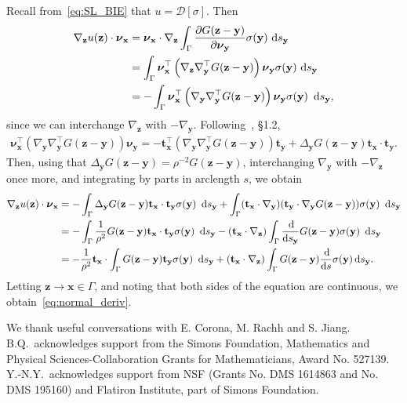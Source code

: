 \documentclass[prb,preprint,showpacs,preprintnumbers,amsmath,amssymb,longbibliography]{revtex4-1}
\newcommand{\nnu}{\boldsymbol{\nu}}
\newcommand{\xx}{\mathbf{x}}
\newcommand{\zz}{\mathbf{z}}
\newcommand{\yy}{\mathbf{y}}
\renewcommand{\tt}{\mathbf{t}}
\begin{document}
Recall from~\eqref{eq:SL_BIE} that $u = \mathcal{D}[\sigma]$.
Then  
\begin{align*}
\nabla_{\zz} u(\zz) \cdot \nnu_{\xx}
&=\nnu_\xx \cdot \nabla_\zz \int_\Gamma \frac{\partial G(\zz-\yy)}{\partial \nnu_\yy}\sigma(\yy) \,\dif s_\yy\\
&=\int_\Gamma \nnu_\xx^\top \left(\nabla_\zz\nabla_\yy^\top  G(\zz-\yy)\right) \nnu_\yy\sigma(\yy)  \,\dif s_\yy\\
  &=-\int_\Gamma \nnu_\xx^\top \left(\nabla_\yy\nabla_\yy^\top G(\zz-\yy)\right)\nnu_\yy\sigma(\yy)\ \dif s_\yy,
\end{align*}
since we can interchange $\nabla_\zz$ with $-\nabla_\yy$.
Following~\citet{Hsiao2008}, \S 1.2,
\begin{align}
\nnu_\xx^\top \left(\nabla_\yy\nabla_\yy^\top G(\zz-\yy)\right)\nnu_\yy
=
-\tt_{\xx}^\top \left(\nabla_\yy\nabla_\yy^\top G(\zz-\yy)\right)\tt_{\yy}
+ \Delta_{\yy}G(\zz-\yy) \tt_{\xx}\cdot \tt_{\yy}.
\end{align}
Then, using that $\Delta_{\yy} G(\zz-\yy) = \rho^{-2} G(\zz-\yy)$,
interchanging $\nabla_\yy$ with $-\nabla_\zz$ once more, and integrating
by parts in arclength $s$, we obtain 
\begin{align*}
\nabla_{\zz} u(\zz) \cdot \nnu_{\xx}
&=-\int_\Gamma  \Delta_\yy G(\zz-\yy) {\bf t}_\xx \cdot   {\bf t}_\yy \sigma(\yy)\ \dif s_\yy
+\int_\Gamma({\bf t}_\xx\cdot\nabla_\yy)({\bf t}_\yy\cdot\nabla_\yy G(\zz-\yy))\sigma(\yy)\ \dif s_\yy\\
&= -\int_\Gamma \frac{1}{\rho^{2}} G(\zz-\yy) {\bf t}_\xx \cdot {\bf t}_\yy \sigma(\yy)\ \dif s_\yy  
-({\bf t}_\xx\cdot\nabla_\zz)\int_\Gamma \frac{\dif}{\dif s_\yy}G(\zz-\yy) \sigma(\yy)\ \dif s_\yy\\
&= -\frac{1}{\rho^2} {\bf t}_\xx\cdot \int_\Gamma G(\zz-\yy){\bf t}_\yy \sigma(\yy)\ \dif s_\yy + 
({\bf t}_\xx \cdot \nabla_\zz)\int_\Gamma G(\zz-\yy)\frac{\dif }{\dif s} \sigma(\yy)  \dif s_\yy.
\end{align*}
%
Letting $\zz\to\xx\in\Gamma$, and noting that both sides of the equation
are continuous, we obtain~\eqref{eq:normal_deriv}.


\begin{acknowledgments}
We thank useful conversations with E. Corona, M. Rachh and S. Jiang.
B.Q.~acknowledges support from the Simons Foundation, Mathematics and Physical Sciences-Collaboration Grants for Mathematicians, Award No. 527139.
Y.-N.Y.~acknowledges support from NSF (Grants No. DMS 1614863 and No. DMS 195160) and Flatiron Institute, part of Simons Foundation.

\end{acknowledgments}




\end{document}
